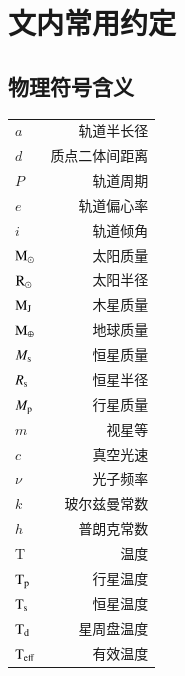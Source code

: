 
\chapter{文内常用约定} \label{apdx:nomenclature}
\section{物理符号含义} \label{apdx:symbol}
\begin{multicols}{2}
\begin{tabularx}{0.85\linewidth}{@{\extracolsep{\fill}}lr}
\centering
$a$      	     			&     轨道半长径 		\\
$d$      	     			&     质点二体间距离	 	\\
$P$      	     			&     轨道周期	 		\\
$e$      	     			&     轨道偏心率 		\\
$i$          	     			&     轨道倾角 			\\
$\mathrm{M}_\odot$          		&     太阳质量   			\\
$\mathrm{R}_\odot$          		&     太阳半径   			\\
$\mathrm{M}_\mathrm{J}$          		&     木星质量   			\\
$\mathrm{M}_\oplus$          	&     地球质量   			\\
$M_\mathrm{s}$          		&     恒星质量   			\\
$R_\mathrm{s}$          		&     恒星半径   			\\
$M_\mathrm{p}$         	 	&     行星质量   			\\
$m$         	 			&     视星等   			\\
$c$         	 			&     真空光速   			\\
$\nu$         	 		&     光子频率   			\\
$k$         	 			&     玻尔兹曼常数   		\\
$h$         	 			&     普朗克常数   		\\
T		       	 		&      温度   			\\
$\mathrm{T}_\mathrm{p}$         	 	&      行星温度   		\\
$\mathrm{T}_\mathrm{s}$         	 	&      恒星温度   		\\
$\mathrm{T}_\mathrm{d}$         	 	&      星周盘温度   		\\
$\mathrm{T}_\mathrm{eff}$         	 	&      有效温度   		\\


\end{tabularx}
\end{multicols}
